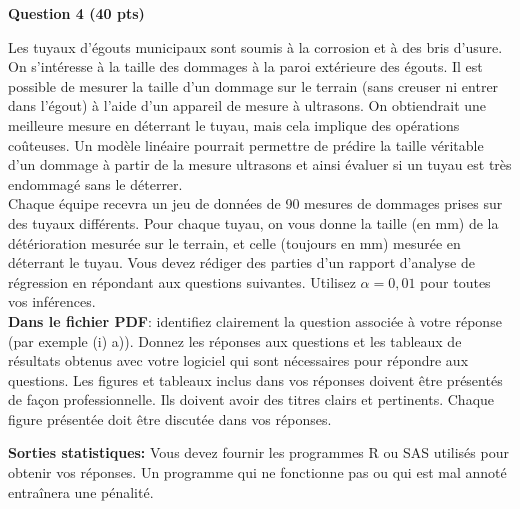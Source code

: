 \documentclass[letter, 11pt]{article}
\begin{document}
\newpage
\vspace{0.2 in}
\textbf{Question 4 (40 pts)} 

Les tuyaux d'égouts municipaux sont soumis à la corrosion et à des bris d'usure.  On s'intéresse à la taille des dommages à la paroi extérieure des égouts. Il est possible de mesurer la taille d'un dommage sur le terrain (sans creuser ni entrer dans l'égout) à l'aide d'un appareil de mesure à ultrasons. On obtiendrait une meilleure mesure en déterrant le tuyau, mais cela implique des opérations coûteuses. %
Un modèle linéaire pourrait permettre de prédire la taille véritable d'un dommage  à partir de la mesure ultrasons et ainsi évaluer si un tuyau est très endommagé sans le déterrer. \\

Chaque équipe recevra un jeu de données de 90 mesures de dommages prises sur des tuyaux différents. %
Pour chaque tuyau, on vous donne la taille (en mm) de la détérioration mesurée sur le terrain, et celle (toujours en mm) mesurée en déterrant le tuyau.  Vous devez rédiger des parties d'un rapport d'analyse de régression en répondant aux questions suivantes. Utilisez $\alpha = 0,01$ pour toutes vos inférences. \\

{\bf Dans le fichier PDF}: identifiez clairement la question associée à votre réponse (par exemple (i) a)). Donnez les réponses aux questions et les tableaux de résultats obtenus avec votre logiciel qui sont nécessaires pour
répondre aux questions. Les figures et tableaux inclus dans vos réponses doivent être présentés de façon professionnelle. Ils doivent avoir des titres clairs et pertinents. Chaque figure présentée doit être discutée dans vos réponses. 

\textbf{Sorties statistiques:}
Vous devez fournir les programmes R ou SAS utilisés pour obtenir vos réponses. Un programme qui ne fonctionne pas ou qui est mal annoté entraînera une pénalité. \\
\end{document}
